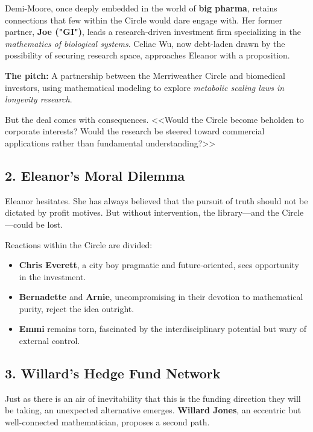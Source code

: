 Demi-Moore, once deeply embedded in the world of \textbf{big pharma}, retains connections that few within the Circle would dare engage with. Her former partner, \textbf{Joe ("GI")}, leads a research-driven investment firm specializing in the \textit{mathematics of biological systems}. Celiac Wu, now debt-laden drawn by the possibility of securing research space, approaches Eleanor with a proposition.

\smallskip

\textbf{The pitch:} A partnership between the Merriweather Circle and biomedical investors, using mathematical modeling to explore \textit{metabolic scaling laws in longevity research}.  

\smallskip

But the deal comes with consequences. <<Would the Circle become beholden to corporate interests? Would the research be steered toward commercial applications rather than fundamental understanding?>>

\subsection*{2. Eleanor's Moral Dilemma}

Eleanor hesitates. She has always believed that the pursuit of truth should not be dictated by profit motives. But without intervention, the library—and the Circle—could be lost.

\smallskip

Reactions within the Circle are divided:
\begin{itemize}
    \item \textbf{Chris Everett}, a city boy pragmatic and future-oriented, sees opportunity in the investment.
    \item \textbf{Bernadette} and \textbf{Arnie}, uncompromising in their devotion to mathematical purity, reject the idea outright.
    \item \textbf{Emmi} remains torn, fascinated by the interdisciplinary potential but wary of external control.
\end{itemize}

\subsection*{3. Willard’s Hedge Fund Network}

Just as there is an air of inevitability that this is the funding direction they will be taking, an unexpected alternative emerges. \textbf{Willard Jones}, an eccentric but well-connected mathematician, proposes a second path.

